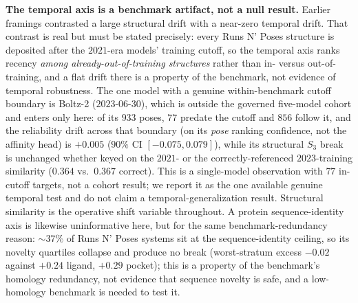 \documentclass[10pt]{article}
\begin{document}
\textbf{The temporal axis is a benchmark artifact, not a null result.} Earlier framings contrasted a large
structural drift with a near-zero temporal drift. That contrast is real but must be stated precisely: every
Runs N' Poses structure is deposited after the $2021$-era models' training cutoff, so the temporal axis
ranks recency \emph{among already-out-of-training structures} rather than in- versus out-of-training, and a
flat drift there is a property of the benchmark, not evidence of temporal robustness. The one model with a
genuine within-benchmark cutoff boundary is Boltz-2 ($2023$-06-30), which is outside the governed five-model
cohort and enters only here: of its $933$ poses, $77$ predate the cutoff and $856$ follow it, and the
reliability drift across that boundary (on its \emph{pose} ranking confidence, not the affinity head) is
$+0.005$ ($90\%$ CI $[-0.075,0.079]$), while its structural $S_3$ break is unchanged whether keyed on the
$2021$- or the correctly-referenced $2023$-training similarity ($0.364$ vs.\ $0.367$ correct). This is a
single-model observation with $77$ in-cutoff targets, not a cohort result; we report it as the one available
genuine temporal test and do not claim a temporal-generalization result. Structural similarity is the
operative shift variable throughout. A protein sequence-identity axis is likewise uninformative here, but for
the same benchmark-redundancy reason: $\sim\!37\%$ of Runs N' Poses systems sit at the sequence-identity
ceiling, so its novelty quartiles collapse and produce no break (worst-stratum excess $-0.02$ against
$+0.24$ ligand, $+0.29$ pocket); this is a property of the benchmark's homology redundancy, not evidence
that sequence novelty is safe, and a low-homology benchmark is needed to test it.
\end{document}
